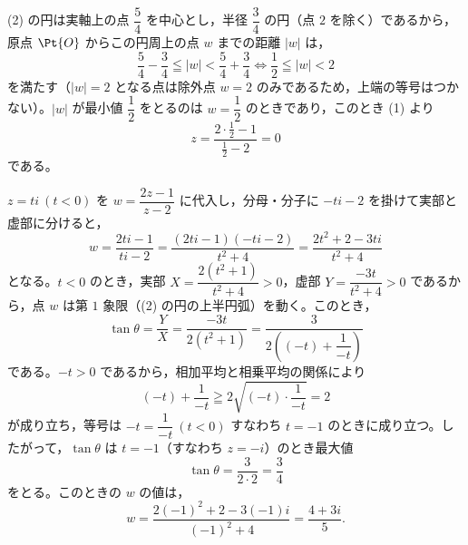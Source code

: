 \begin{center}
\end{center}


(2) の円は実軸上の点 $\dfrac{5}{4}$ を中心とし，半径 $\dfrac{3}{4}$ の円（点 $2$ を除く）であるから，原点 $\Pt{O}$ からこの円周上の点 $w$ までの距離 $|w|$ は，
\[
  \frac{5}{4}-\frac{3}{4} \leqq |w| < \frac{5}{4}+\frac{3}{4}
  \iff \frac{1}{2} \leqq |w| < 2
\]
を満たす（$|w|=2$ となる点は除外点 $w=2$ のみであるため，上端の等号はつかない）。$|w|$ が最小値 $\dfrac{1}{2}$ をとるのは $w=\dfrac{1}{2}$ のときであり，このとき (1) より
\[
  z = \frac{2\cdot\frac{1}{2}-1}{\frac{1}{2}-2} = 0
\]
である。


$z=ti\ (t<0)$ を $w=\dfrac{2z-1}{z-2}$ に代入し，分母・分子に $-ti-2$ を掛けて実部と虚部に分けると，
\[
  w = \frac{2ti-1}{ti-2} = \frac{(2ti-1)(-ti-2)}{t^{2}+4} = \frac{2t^{2}+2 - 3ti}{t^{2}+4}
\]
となる。$t<0$ のとき，実部 $X=\dfrac{2(t^{2}+1)}{t^{2}+4}>0$，虚部 $Y=\dfrac{-3t}{t^{2}+4}>0$ であるから，点 $w$ は第 $1$ 象限（(2) の円の上半円弧）を動く。このとき，
\[
  \tan\theta = \frac{Y}{X} = \frac{-3t}{2(t^{2}+1)} = \frac{3}{2\left((-t)+\dfrac{1}{-t}\right)}
\]
である。$-t>0$ であるから，相加平均と相乗平均の関係により
\[
  (-t) + \frac{1}{-t} \geqq 2\sqrt{(-t)\cdot\frac{1}{-t}} = 2
\]
が成り立ち，等号は $-t=\dfrac{1}{-t}\ (t<0)$ すなわち $t=-1$ のときに成り立つ。したがって，$\tan\theta$ は $t=-1$（すなわち $z=-i$）のとき最大値
\[
  \tan\theta = \frac{3}{2\cdot 2} = \frac{3}{4}
\]
をとる。このときの $w$ の値は，
\[
  w = \frac{2(-1)^{2}+2-3(-1)i}{(-1)^{2}+4} = \frac{4+3i}{5}.
\]

